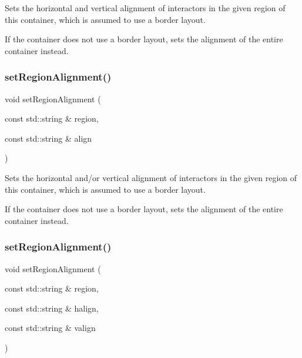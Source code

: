 Sets the horizontal and vertical alignment of interactors in the given region of this container, which is assumed to use a border layout. 

If the container does not use a border layout, sets the alignment of the entire container instead. \mbox{\label{classsgl_1_1GContainer_ae4ff46516be9472498c0bf058b496e8b}} 
\subsubsection{\texorpdfstring{set\+Region\+Alignment()}{setRegionAlignment()}\hspace{0.1cm}{\footnotesize\ttfamily [4/5]}}
{\footnotesize\ttfamily void set\+Region\+Alignment (\begin{DoxyParamCaption}\item[{const std\+::string \&}]{region,  }\item[{const std\+::string \&}]{align }\end{DoxyParamCaption})\hspace{0.3cm}{\ttfamily [virtual]}}



Sets the horizontal and/or vertical alignment of interactors in the given region of this container, which is assumed to use a border layout. 

If the container does not use a border layout, sets the alignment of the entire container instead. \mbox{\label{classsgl_1_1GContainer_ad1c76be81b3b865f78b0e91f0e1f07d4}} 
\subsubsection{\texorpdfstring{set\+Region\+Alignment()}{setRegionAlignment()}\hspace{0.1cm}{\footnotesize\ttfamily [5/5]}}
{\footnotesize\ttfamily void set\+Region\+Alignment (\begin{DoxyParamCaption}\item[{const std\+::string \&}]{region,  }\item[{const std\+::string \&}]{halign,  }\item[{const std\+::string \&}]{valign }\end{DoxyParamCaption})\hspace{0.3cm}{\ttfamily [virtual]}}




